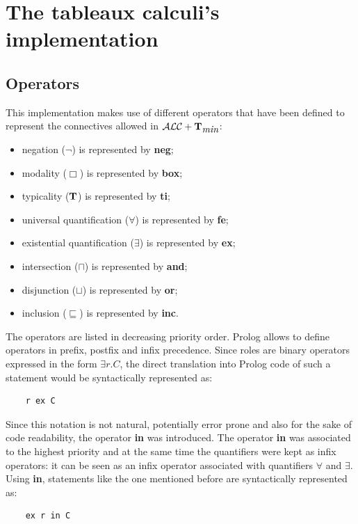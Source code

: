 \documentclass[a4paper, 11pt, oneside]{duthesis}
\newcommand{\tip}{{\bf T}}
\newcommand{\alctmin}{\mathcal{ALC}+\tip_{\mbox{\em min}}}
\newcommand{\perogni} {\forall}
\newcommand{\esiste} {\exists}
\begin{document}
\section{The tableaux calculi's implementation}

\subsection{Operators}

This implementation makes use of different operators that have been defined to represent the connectives allowed in $\alctmin$:

\begin{itemize}
\item negation ($\neg$) is represented by \textbf{neg};
\item modality ($\Box$) is represented by \textbf{box};
\item typicality ($\tip$) is represented by \textbf{ti};
\item universal quantification ($\perogni$) is represented by \textbf{fe};
\item existential quantification ($\esiste$) is represented by \textbf{ex};
\item intersection ($\sqcap$) is represented by \textbf{and};
\item disjunction ($\sqcup$) is represented by \textbf{or};
\item inclusion ($\sqsubseteq$) is represented by \textbf{inc}.
\end{itemize}

The operators are listed in decreasing priority order.
Prolog allows to define operators in prefix, postfix and infix precedence.
Since roles are binary operators expressed in the form $\esiste r.C$, the direct translation into Prolog code of such a statement would be syntactically represented as:
\begin{verbatim}
    r ex C
\end{verbatim}
Since this notation is not natural, potentially error prone and also for the sake of code readability, the operator \textbf{in} was introduced.
The operator \textbf{in} was associated to the highest priority and at the same time the quantifiers were kept as infix operators: it can be seen as an infix operator associated with quantifiers $\perogni$ and $\esiste$.
Using \textbf{in}, statements like the one mentioned before are syntactically represented as:
\begin{verbatim}
    ex r in C
\end{verbatim}
\end{document}
